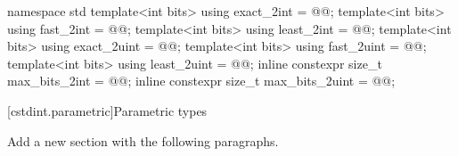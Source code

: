 \begin{addedblock}
\begin{codeblock}
namespace std {
  template<int bits> using exact_2int = @\impdefx{}@;
  template<int bits> using fast_2int = @\impdefx{}@;
  template<int bits> using least_2int = @\impdefx{}@;
  template<int bits> using exact_2uint = @\impdefx{}@;
  template<int bits> using fast_2uint = @\impdefx{}@;
  template<int bits> using least_2uint = @\impdefx{}@;
}
inline constexpr size_t max_bits_2int = @\impdefx{}@;
inline constexpr size_t max_bits_2uint = @\impdefx{}@;
\end{codeblock}
\end{addedblock}

[cstdint.parametric]{Parametric types}

Add a new section with the following paragraphs.


